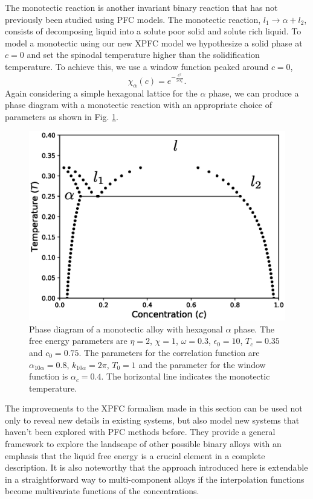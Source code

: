 \documentclass[showkeys, prb, reprint]{revtex4-1}
\newcommand{\f}{\frac}          %
\begin{document}
The monotectic reaction is another invariant binary reaction that has not
previously been studied using PFC models. The monotectic reaction, $l_1
\rightarrow \alpha + l_2$, consists of decomposing liquid into a solute poor
solid and solute rich liquid. To model a monotectic using our new XPFC
model we hypothesize a solid phase at $c=0$ and set the spinodal temperature
higher than the solidification temperature. To achieve this, we use a window
function peaked around $c = 0$,
%
\begin{equation}
    \chi_\alpha(c) = e^{-\f{c^2}{2\alpha_c^2}}.
\end{equation}
%
Again considering a simple hexagonal lattice for the $\alpha$ phase, we can
produce a phase diagram with a monotectic reaction with an appropriate choice
of parameters as shown in Fig. \ref{monotectic}.
%
\begin{figure}
	\includegraphics[scale=0.5]{monotectic.eps}
    \caption[Monotectic Phase Diagram]{
        \label{monotectic} Phase diagram of a monotectic alloy with hexagonal
        $\alpha$ phase. The free energy parameters are $\eta = 2$, $\chi=1$,
        $\omega=0.3$, $\epsilon_0 = 10$, $T_c = 0.35$ and $c_0 = 0.75$. The
        parameters for the correlation function are {\color{red} $\alpha_{10\alpha} = 0.8$},
        $k_{10\alpha} = 2\pi$, $T_0 = 1$ and the parameter for the window
        function is $\alpha_c = 0.4$. The horizontal line indicates the 
        monotectic temperature.
    }
\end{figure}

The improvements to the XPFC formalism made in this section can be used 
 not only to reveal new details in existing systems, but also model new systems that haven't been explored with PFC methods before. They provide a general framework to explore the landscape of other possible  binary alloys with an emphasis that
the liquid free energy is a crucial element in a complete description. It is
also noteworthy that the approach introduced here is extendable in a
straightforward way to multi-component alloys if the interpolation functions
become multivariate functions of the concentrations.
\end{document}
